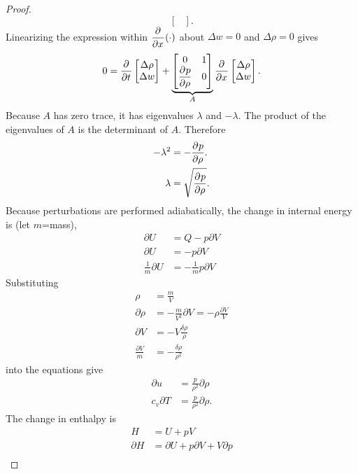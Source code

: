 \documentclass{doc}
\begin{document}
\begin{proof}
\begin{equation}
\begin{bmatrix}
\end{bmatrix}.
\end{equation}
Linearizing the expression within $\dfrac{\partial^{} {}}{\partial {x}^{} }(\cdot)$ about $\Delta w=0$
and $\Delta \rho=0$ gives
\begin{equation}
0 = \dfrac{\partial^{} {}}{\partial {t}^{} } \begin{bmatrix}
    \Delta \rho \\
    \Delta w
\end{bmatrix} +
\underbrace{\begin{bmatrix}
    0 & 1 \\
    \dfrac{\partial^{} {p}}{\partial {\rho}^{} } & 0
\end{bmatrix}}_{A}
\dfrac{\partial^{} {}}{\partial {x}^{} } \begin{bmatrix}
    \Delta \rho \\
    \Delta w
\end{bmatrix}.
\end{equation}
Because $A$ has zero trace, it has eigenvalues $\lambda$ and $-\lambda$.
The product of the eigenvalues of $A$ is the determinant of $A$.  Therefore
\begin{align}
    -\lambda^2 &= -\dfrac{\partial^{} {p}}{\partial {\rho}^{} }. \\
    \lambda &= \sqrt{\dfrac{\partial^{} {p}}{\partial {\rho}^{} }}.
\end{align}
Because perturbations are performed adiabatically,  the change
in internal energy is (let $m$=mass),
\begin{align}
    \partial U &= Q - p \partial V \\
    \partial U &= -p \partial V \\
    \frac{1}{m} \partial U &= -\frac{1}{m} p \partial V
\end{align}
Substituting
\begin{align}
    \rho &= \frac{m}{V} \\
    \partial \rho &= -\frac{m}{V^2} \partial V = -\rho \frac{\partial{V}}{V} \\
    \partial V &= -V\frac{\delta\rho}{\rho} \\
    \frac{\partial V}{m} &= -\frac{\delta\rho}{\rho^2}
\end{align}
into the equations give
\begin{align}
    \partial u &= \frac{p}{\rho^2}\partial \rho \\
    c_v \partial T &= \frac{p}{\rho^2}\partial \rho.
\end{align}
The change in enthalpy is
\begin{align}
    H &= U + pV \\
    \partial H &= \partial U + p \partial V + V \partial p \\

\end{align}
\end{proof}
\end{document}
